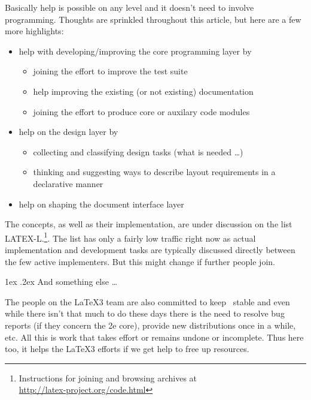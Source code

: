 \documentclass{ltnews}
\makeatletter
\newcommand{\@subheadingfont}{%
   \sffamily\slshape
   \let\LaTeX\cmssLaTeX\let\TeX\cmssTeX
}
\renewcommand{\subsection}{%
   \@startsection
      {section}{1}{\z@}{-1.5ex \@plus -1ex \@minus -.2ex}%
      {1ex \@plus.2ex}{\@subheadingfont}%
}
\makeatother
\begin{document}
Basically help is possible on any level and it doesn't need to involve programming. Thoughts are sprinkled throughout this article, but here are a few more highlights:
\begin{itemize}
\item help with developing/improving the core programming layer by
\begin{itemize}[nosep]
\item joining the effort to improve the test suite
\item help improving the existing (or not existing) documentation
\item joining the effort to produce core or auxilary code modules
\end{itemize}
\item help on the design layer by
\begin{itemize}[nosep]
\item collecting and classifying design tasks (what is needed \dots)
\item thinking and suggesting ways to describe layout requirements in a declarative manner
\end{itemize}
\item help on shaping the document interface layer
\end{itemize}
The concepts, as well as their implementation, are under discussion on the list LATEX-L.\footnote{Instructions for joining and browsing archives at\\ \url{http://latex-project.org/code.html}}.
The list has only a fairly low traffic right now as actual implementation and development tasks are typically discussed directly between the few active implementers. But this might change if further people join.

\subsection{And something else \dots}

The people on the \LaTeX3 team are also committed to keep \LaTeXe\ stable and even while there isn't that much to do these days there is the need to resolve bug reports (if they concern the 2e core), provide new distributions once in a while, etc. All this is work that takes effort or remains undone or incomplete. Thus here too, it helps the \LaTeX3 efforts if we get help to free up resources.
\end{document}
